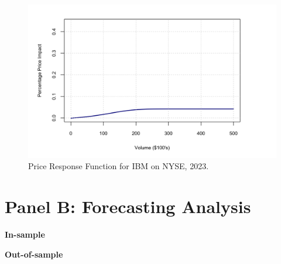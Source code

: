 \begin{figure}[H]
    \centering
    \includegraphics[width=1.1\textwidth]{figures/main_results/price_response.png}
    \caption{Price Response Function for IBM on NYSE, 2023.}
    \label{fig:figure-2}
\end{figure}


\clearpage



\section{Panel B: Forecasting Analysis}

{\noindent\bfseries In-sample }

{\noindent\bfseries Out-of-sample }
